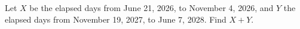 Let $X$ be the elapsed days from June 21, 2026, to November 4, 2026, and $Y$ the elapsed days from November 19, 2027, to June 7, 2028. Find $X+Y$.
